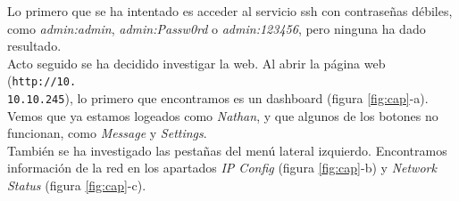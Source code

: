 Lo primero que se ha intentado es acceder al servicio \acrshort{ssh} con contraseñas débiles, como \textit{admin:admin}, \textit{admin:Passw0rd} o \textit{admin:123456}, pero ninguna ha dado resultado.\\

Acto seguido se ha decidido investigar la web. Al abrir la página web (\texttt{http://10.\\10.10.245}), lo primero que encontramos es un dashboard (figura \ref{fig:cap}-a). Vemos que ya estamos logeados como \textit{Nathan}, y que algunos de los botones no funcionan, como \textit{Message} y \textit{Settings}.\\

También se ha investigado las pestañas del menú lateral izquierdo. Encontramos información de la red en los apartados \textit{IP Config} (figura \ref{fig:cap}-b) y \textit{Network Status} (figura \ref{fig:cap}-c).\\

